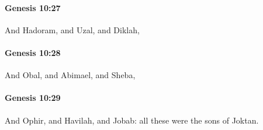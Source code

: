 		\paragraph{Genesis 10:27} %
			\label{GENESIS-10-27}

			And Hadoram, and Uzal, and Diklah,


		\paragraph{Genesis 10:28} %
			\label{GENESIS-10-28}

			And Obal, and Abimael, and Sheba,


		\paragraph{Genesis 10:29} %
			\label{GENESIS-10-29}

			And Ophir, and Havilah, and Jobab: all these were the sons of Joktan.


